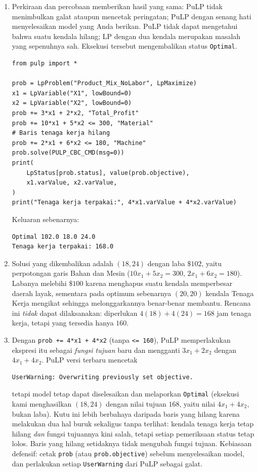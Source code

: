 \begin{enumerate}
\item Perkiraan dan percobaan memberikan hasil yang sama: PuLP tidak
menimbulkan galat ataupun mencetak peringatan; PuLP dengan senang hati
menyelesaikan model yang Anda berikan. PuLP tidak dapat mengetahui bahwa suatu
kendala hilang; LP dengan dua kendala merupakan masalah yang sepenuhnya sah.
Eksekusi tersebut mengembalikan status \texttt{Optimal}.

\begin{verbatim}
from pulp import *

prob = LpProblem("Product_Mix_NoLabor", LpMaximize)
x1 = LpVariable("X1", lowBound=0)
x2 = LpVariable("X2", lowBound=0)
prob += 3*x1 + 2*x2, "Total_Profit"
prob += 10*x1 + 5*x2 <= 300, "Material"
# Baris tenaga kerja hilang
prob += 2*x1 + 6*x2 <= 180, "Machine"
prob.solve(PULP_CBC_CMD(msg=0))
print(
    LpStatus[prob.status], value(prob.objective),
    x1.varValue, x2.varValue,
)
print("Tenaga kerja terpakai:", 4*x1.varValue + 4*x2.varValue)
\end{verbatim}

Keluaran sebenarnya:
\begin{verbatim}
Optimal 102.0 18.0 24.0
Tenaga kerja terpakai: 168.0
\end{verbatim}

\item Solusi yang dikembalikan adalah $(18, 24)$ dengan laba $\$102$, yaitu
perpotongan garis Bahan dan Mesin ($10x_1 + 5x_2 = 300$,
$2x_1 + 6x_2 = 180$). Labanya melebihi $\$100$ karena menghapus suatu kendala
memperbesar daerah layak, sementara pada optimum sebenarnya $(20,20)$ kendala
Tenaga Kerja mengikat sehingga melonggarkannya benar-benar membantu. Rencana
ini \emph{tidak} dapat dilaksanakan: diperlukan
$4(18) + 4(24) = 168$ jam tenaga kerja, tetapi yang tersedia hanya $160$.

\item Dengan \texttt{prob += 4*x1 + 4*x2} (tanpa \texttt{<= 160}), PuLP
memperlakukan ekspresi itu sebagai \emph{fungsi tujuan} baru dan mengganti
$3x_1 + 2x_2$ dengan $4x_1 + 4x_2$. PuLP versi terbaru mencetak
\begin{verbatim}
UserWarning: Overwriting previously set objective.
\end{verbatim}
tetapi model tetap dapat diselesaikan dan melaporkan \texttt{Optimal}
(eksekusi kami menghasilkan $(18, 24)$ dengan nilai tujuan $168$, yaitu nilai
$4x_1 + 4x_2$, bukan laba). Kutu ini lebih berbahaya daripada baris yang
hilang karena melakukan dua hal buruk sekaligus tanpa terlihat: kendala tenaga
kerja tetap hilang \emph{dan} fungsi tujuannya kini salah, tetapi setiap
pemeriksaan status tetap lolos. Baris yang hilang setidaknya tidak mengubah
fungsi tujuan. Kebiasaan defensif: cetak \texttt{prob} (atau
\texttt{prob.objective}) sebelum menyelesaikan model, dan perlakukan setiap
\texttt{UserWarning} dari PuLP sebagai galat.
\end{enumerate}

